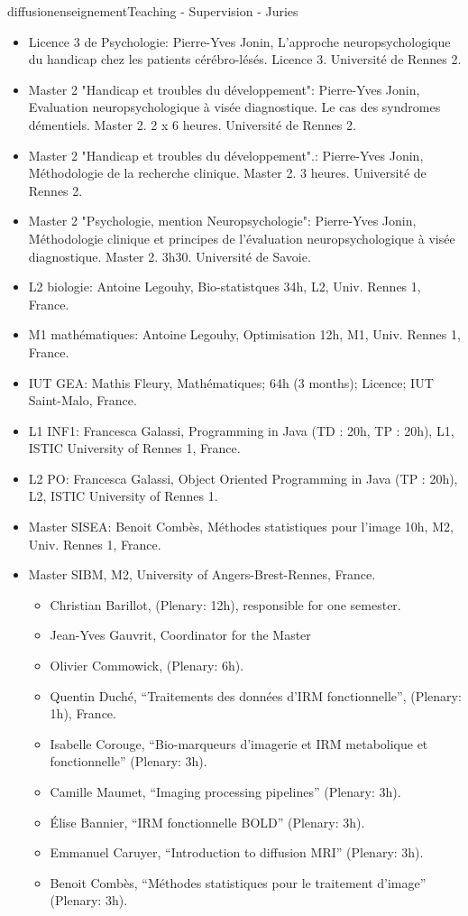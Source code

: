 \documentclass{ra2018}
\begin{document}
\begin{module}{diffusion}{enseignement}{Teaching - Supervision - Juries}
\begin{itemize}
    \item Licence 3 de Psychologie: Pierre-Yves Jonin, L'approche neuropsychologique du handicap chez les patients cérébro-lésés. Licence 3. Université de Rennes 2.
    \item Master 2 "Handicap et troubles du développement": Pierre-Yves Jonin, Evaluation neuropsychologique à visée diagnostique. Le cas des syndromes démentiels. Master 2. 2 x 6 heures. Université de Rennes 2.
    \item Master 2 "Handicap et troubles du développement".: Pierre-Yves Jonin, Méthodologie de la recherche clinique. Master 2. 3 heures. Université de Rennes 2.
    \item Master 2 "Psychologie, mention Neuropsychologie": Pierre-Yves Jonin, Méthodologie clinique et principes de l’évaluation neuropsychologique à visée diagnostique. Master 2. 3h30. Université de Savoie.
    \item L2 biologie: Antoine Legouhy, Bio-statistques 34h, L2, Univ. Rennes 1, France.
    \item M1 mathématiques: Antoine Legouhy, Optimisation 12h, M1, Univ. Rennes 1, France.
    \item IUT GEA: Mathis Fleury, Mathématiques; 64h (3 months); Licence; IUT Saint-Malo, France.
    \item L1 INF1: Francesca Galassi, Programming in Java (TD : 20h, TP : 20h), L1, ISTIC University of Rennes 1, France.
    \item L2 PO: Francesca Galassi, Object Oriented Programming in Java (TP : 20h), L2, ISTIC University of Rennes 1.
    \item Master SISEA: Benoit Combès, Méthodes statistiques pour l'image 10h, M2, Univ. Rennes 1, France.
    \item Master SIBM, M2, University of Angers-Brest-Rennes, France.
    \begin{itemize}
        \item Christian Barillot, (Plenary: 12h), responsible for one semester.
        \item Jean-Yves Gauvrit, Coordinator for the Master
        \item Olivier Commowick, (Plenary: 6h).
        \item Quentin Duché, ``Traitements des données d'IRM fonctionnelle'', (Plenary: 1h), France.
        \item Isabelle Corouge, ``Bio-marqueurs d’imagerie et IRM metabolique et fonctionnelle'' (Plenary: 3h).
        \item Camille Maumet, ``Imaging processing pipelines'' (Plenary: 3h).
        \item Élise Bannier, ``IRM fonctionnelle BOLD'' (Plenary: 3h).
        \item Emmanuel Caruyer, ``Introduction to diffusion MRI'' (Plenary: 3h).
        \item Benoit Combès, ``Méthodes statistiques pour le traitement d'image''  (Plenary: 3h).
     \end{itemize}
 \end{itemize}


\end{module}
\end{document}
